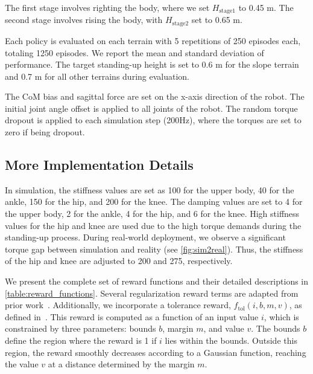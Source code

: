  The first stage involves righting the body, where we set $H_{\mathrm{stage1}}$ to 0.45 m. The second stage involves rising the body, with $H_{\mathrm{stage2}}$ set to 0.65 m.

 Each policy is evaluated on each terrain with 5 repetitions of 250 episodes each, totaling 1250 episodes. We report the mean and standard deviation of performance. The target standing-up height is set to 0.6 m for the slope terrain and 0.7 m for all other terrains during evaluation.

 The CoM bias and sagittal force are set on the x-axis direction of the robot. The initial joint angle offset is applied to all joints of the robot. The random torque dropout is applied to each simulation step (200Hz), where the torques are set to zero if being dropout. 

\subsection{More Implementation Details}\label{app:hyperparams}

 In simulation, the stiffness values are set as 100 for the upper body, 40 for the ankle, 150 for the hip, and 200 for the knee. The damping values are set to 4 for the upper body, 2 for the ankle, 4 for the hip, and 6 for the knee. High stiffness values for the hip and knee are used due to the high torque demands during the standing-up process. During real-world deployment, we observe a significant torque gap between simulation and reality (see \cref{fig:sim2real}). Thus, the stiffness of the hip and knee are adjusted to 200 and 275, respectively.

 We present the complete set of reward functions and their detailed descriptions in \cref{table:reward_functions}. Several regularization reward terms are adapted from prior work~\cite{kumar2021rma,long2024learning,He2024OmniH2OUA}. Additionally, we incorporate a tolerance reward, $f_\mathrm{tol}(i, b, m, v)$, as defined in~\cite{tassa2018deepmind, tao2022learning}. This reward is computed as a function of an input value $i$, which is constrained by three parameters: bounds $b$, margin $m$, and value $v$. The bounds $b$ define the region where the reward is 1 if $i$ lies within the bounds. Outside this region, the reward smoothly decreases according to a Gaussian function, reaching the value $v$ at a distance determined by the margin $m$.

